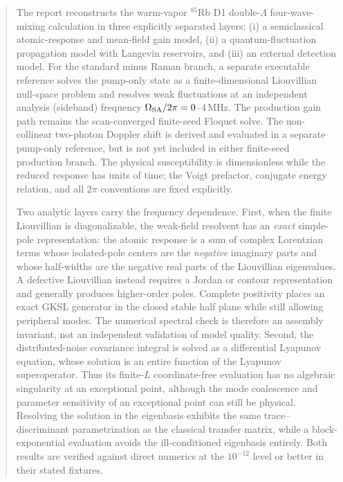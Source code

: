 \documentclass[11pt,a4paper]{article}
\newcommand{\MHz}{\,\mathrm{MHz}}
\begin{document}
\begin{abstract}
The report reconstructs the warm-vapor $^{85}$Rb D1 double-$\Lambda$
four-wave-mixing calculation in three explicitly separated layers:
(i) a semiclassical atomic-response and mean-field gain model,
(ii) a quantum-fluctuation propagation model with Langevin reservoirs, and
(iii) an external detection model. For the standard minus Raman branch, a
separate executable reference solves the pump-only state as a
finite-dimensional Liouvillian null-space problem and resolves weak
fluctuations at an independent analysis (sideband) frequency
$\Omega_{\rm SA}/2\pi=0$--$4\MHz$. The production gain path remains the
scan-converged finite-seed Floquet solve. The non-collinear two-photon Doppler
shift is derived and evaluated in a separate pump-only reference, but is not
yet included in either finite-seed production branch.
The physical susceptibility is dimensionless while the reduced response has
units of time; the Voigt prefactor, conjugate energy relation, and all $2\pi$
conventions are fixed explicitly.

Two analytic layers carry the frequency dependence. First, when the finite
Liouvillian is diagonalizable, the weak-field resolvent has an \emph{exact}
simple-pole representation: the atomic response is a sum of complex
Lorentzian terms whose isolated-pole centers are the \emph{negative} imaginary
parts and whose half-widths are the negative real parts of the Liouvillian
eigenvalues. A defective Liouvillian instead requires a Jordan or contour
representation and generally produces higher-order poles. Complete positivity
places an exact GKSL generator in the closed stable half plane while still
allowing peripheral modes. The numerical spectral check is therefore an
assembly invariant, not an independent validation of model quality. Second,
the distributed-noise covariance integral is solved as a differential
Lyapunov equation, whose solution is an entire
function of the Lyapunov superoperator. Thus its finite-$L$ coordinate-free
evaluation has no algebraic singularity at an exceptional point, although the
mode coalescence and parameter sensitivity of an exceptional point can still
be physical. Resolving the solution in the eigenbasis exhibits the same
trace--discriminant parametrization as the classical transfer matrix, while a
block-exponential evaluation avoids the ill-conditioned eigenbasis entirely.
Both results are verified against direct numerics at the $10^{-12}$ level or
better in their stated fixtures.


\end{abstract}
\end{document}
